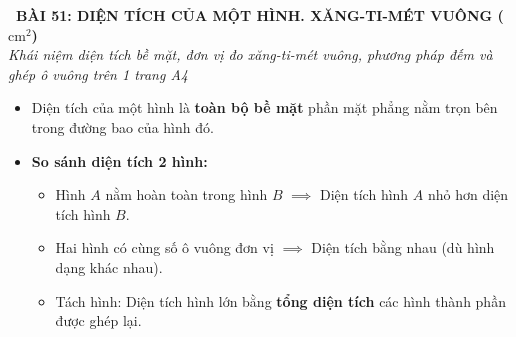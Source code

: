 \documentclass[11pt,a4paper]{article}
\begin{document}
\begin{tcolorbox}[
  enhanced,
  colback=white,
  colframe=primary,
  arc=3mm,
  boxrule=1.2pt,
  left=4mm, right=4mm, top=2.5mm, bottom=2.5mm,
  drop shadow=black!10!white
]
  \centering
  {\Large\bfseries\color{primary}\faBookmark\ BÀI 51: DIỆN TÍCH CỦA MỘT HÌNH. XĂNG-TI-MÉT VUÔNG ($\text{cm}^2$)}\\[1.5mm]
  {\small\itshape\color{black!75}Khái niệm diện tích bề mặt, đơn vị đo xăng-ti-mét vuông, phương pháp đếm và ghép ô vuông trên 1 trang A4}
\end{tcolorbox}

\vspace{-2mm}


\noindent
\begin{minipage}[t]{0.49\textwidth}\vspace{0pt}
\begin{tcolorbox}[
  enhanced,
  colback=blue!4!white,
  colframe=blue!75!black,
  arc=2mm, boxrule=0.8pt,
  left=2mm, right=2mm, top=1.8mm, bottom=1.8mm,
  title={\footnotesize\bfseries\color{white}\faKey\ 1. Khái niệm Diện tích của một hình}
]
{\footnotesize
\begin{itemize}\setlength{\itemsep}{1.5pt}\setlength{\leftskip}{-2.5mm}
  \item Diện tích của một hình là \textbf{toàn bộ bề mặt} phần mặt phẳng nằm trọn bên trong đường bao của hình đó.
  \item \textbf{So sánh diện tích 2 hình:}
  \begin{itemize}\setlength{\itemsep}{0.5pt}\setlength{\leftskip}{-2.5mm}
    \item Hình $A$ nằm hoàn toàn trong hình $B$ $\implies$ Diện tích hình $A$ nhỏ hơn diện tích hình $B$.
    \item Hai hình có cùng số ô vuông đơn vị $\implies$ Diện tích bằng nhau (dù hình dạng khác nhau).
    \item Tách hình: Diện tích hình lớn bằng \textbf{tổng diện tích} các hình thành phần được ghép lại.
  \end{itemize}
\end{itemize}
}
\end{tcolorbox}
\end{minipage}
\hfill
\end{document}
